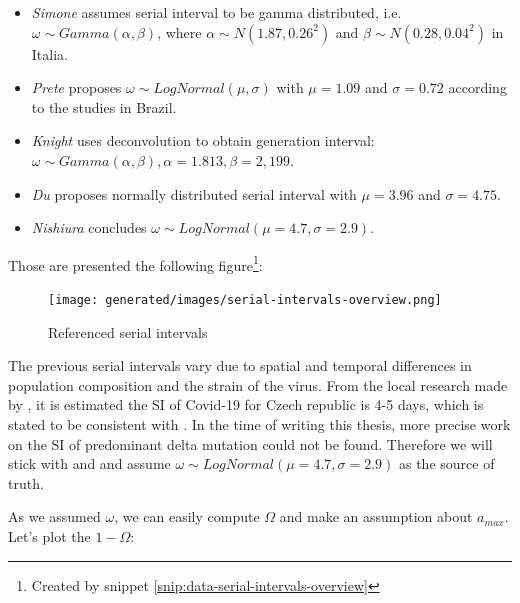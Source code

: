 \documentclass[
  digital, %
  oneside, %
  lof,     %
  lot,     %
]{fithesis4}
\begin{document}
\begin{itemize}
  \item \textit{Simone} \cite{simone2020} assumes serial interval to be gamma 
  distributed, i.e. $\omega \sim Gamma(\alpha,\beta)$, where 
  $\alpha \sim N \left( 1.87, 0.26^2 \right)$ and 
  $\beta \sim N \left( 0.28, 0.04^2 \right)$ in Italia.

  \item \textit{Prete} \cite{prete2020} proposes $\omega \sim LogNormal(\mu, \sigma)$ 
  with $\mu = 1.09$ and $\sigma = 0.72$ according to the 
  studies in Brazil.

  \item \textit{Knight} \cite{knight2020} uses deconvolution 
  to obtain generation interval: $\omega \sim Gamma(\alpha, \beta), \alpha = 1.813, \beta = 2,199$.

  \item \textit{Du} \cite{du2020} proposes normally distributed serial 
  interval with $\mu = 3.96$ and $\sigma = 4.75$.

  \item \textit{Nishiura} \cite{nishiura2020} concludes 
  $\omega \sim LogNormal \left( \mu = 4.7, \sigma = 2.9 \right)$.
\end{itemize}

Those are presented the following figure\footnote{Created by snippet \ref{snip:data-serial-intervals-overview}}:

\begin{figure}[H]
  \begin{center}
    \texttt{[image: generated/images/serial-intervals-overview.png]}
  \end{center}
  \caption{Referenced serial intervals}
  \label{fig:serial-intervals-overview}
\end{figure}

The previous serial intervals vary due to spatial and 
temporal differences in population composition and the
strain of the virus.
From the local research made by \cite{majek2020}, 
it is estimated the SI of Covid-19 for Czech republic is 4-5 days, which is 
stated to be consistent with \cite{nishiura2020}. 
In the time of writing this thesis, more precise work on the 
SI of predominant delta mutation could not be found. 
Therefore we will stick with \cite{majek2020} and 
\cite{nishiura2020} and assume 
$\omega \sim LogNormal \left( \mu = 4.7, \sigma = 2.9 \right)$ 
as the source of truth.

As we assumed $\omega$, we can easily compute $\Omega$ and 
make an assumption about $a_{max}$.
Let's plot the $1 - \Omega$:
\end{document}
